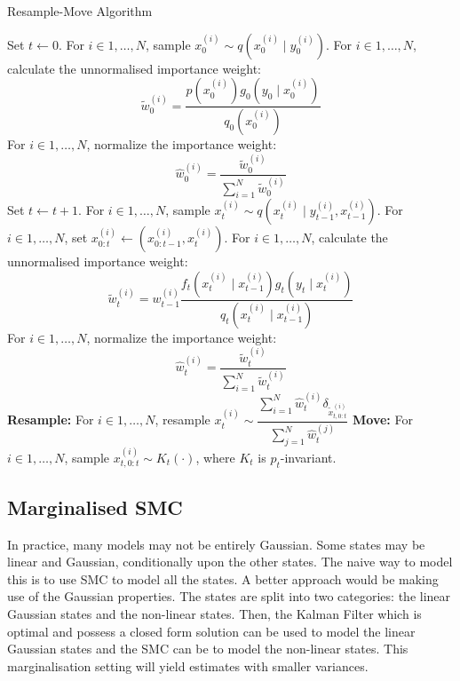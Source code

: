 \begin{algorithm}
\caption{Resample-Move Algorithm}\label{algo:rm}
\begin{algorithmic}[1]
\State Set $t \gets 0$.
\State For $i \in 1, \ldots, N$, sample $x^{(i)}_0 \sim q(x^{(i)}_0 \mid y^{(i)}_0)$.
\State For $i \in 1, \ldots, N$, calculate the unnormalised importance weight:
\begin{equation*}
 \tilde{w}^{(i)}_0 = \dfrac{p(x_0^{(i)})g_0(y_0 \mid x^{(i)}_0)}{q_0(x^{(i)}_0)}
\end{equation*}
\State For $i \in 1, \ldots, N$, normalize the importance weight:
\begin{equation*}
\hat{w}^{(i)}_0 = \dfrac{\tilde{w}^{(i)}_0}{\sum^N_{i=1} \tilde{w}^{(i)}_0}
\end{equation*}
\State Set $t \gets t + 1$.
\State For $i \in 1, \ldots, N$, sample $x^{(i)}_t \sim q(x^{(i)}_t \mid y^{(i)}_{t-1}, x^{(i)}_{t-1})$.
\State For $i \in 1, \ldots, N$, set $x^{(i)}_{0:t} \gets (x^{(i)}_{0:t-1}, x^{(i)}_t)$.
\State For $i \in 1, \ldots, N$, calculate the unnormalised importance weight:
\begin{equation*}
 \tilde{w}^{(i)}_t = w^{(i)}_{t-1} \dfrac{f_t(x^{(i)}_t \mid x^{(i)}_{t-1})g_t(y_t \mid x^{(i)}_t)}{q_t(x^{(i)}_t \mid x^{(i)}_{t-1})}
\end{equation*}
\State For $i \in 1, \ldots, N$, normalize the importance weight:
\begin{equation*}
\hat{w}^{(i)}_t = \dfrac{\tilde{w}^{(i)}_t}{\sum^N_{i=1} \tilde{w}^{(i)}_t}
\end{equation*}
\State \textbf{Resample:} For $i \in 1, \ldots, N$, resample $ x^{(i)}_t \sim \dfrac{\sum^N_{i=1}\hat{w}^{(i)}_t\delta_{\tilde{x}^{(i)}_{t,0:t}}}{\sum^N_{j=1} \hat{w}^{(j)}_t}$
\State \textbf{Move:} For $i \in 1, \ldots, N$, sample $x^{(i)}_{t,0:t} \sim K_t(\cdot)$, where $K_t$ is $p_t$-invariant.
\EndWhile
\EndFunction
\end{algorithmic}
\end{algorithm}

\subsection{Marginalised SMC}
\label{sec:msmc}
In practice, many models may not be entirely Gaussian. Some states may be linear and Gaussian, conditionally upon the other states. The naive way to model this is to use SMC to model all the states. A better approach would be making use of the Gaussian properties. The states are split into two categories: the linear Gaussian states and the non-linear states. Then, the Kalman Filter which is optimal and possess a closed form solution can be used to model the linear Gaussian states and the SMC can be to model the non-linear states. This marginalisation setting will yield estimates with smaller variances. 

